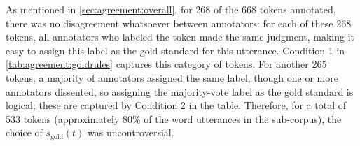 				
		
		
		
		As mentioned in \cref{sec:agreement:overall}, for 268 of the 
		668 tokens annotated, there was no disagreement whatsoever between annotators: for each of these 268 tokens, all annotators who labeled the token made the same judgment, making it easy to assign this label as the gold standard for this utterance. Condition 1 in \cref{tab:agreement:goldrules} captures this category of tokens. 
		For another 265 tokens, a majority of annotators assigned the same label, though one or more annotators dissented, so assigning the majority-vote label as the gold standard is logical; these are captured by Condition 2  in the table. Therefore, for a total of 533 tokens (approximately 80\% of the word utterances in the sub-corpus), the choice of $s_{\text{gold}}(t)$ was uncontroversial.
		
